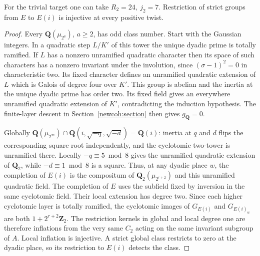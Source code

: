 \begin{corollary}
\label{adds:zeta-injection}
For the trivial target one can take \(R_2=24,\ j_2=7\).
Restriction of strict groups from \(E\) to \(E(i)\) is injective
at every positive twist.
\end{corollary}
\begin{proof}
Every \(\mathbf Q(\mu_{2^a})\), \(a\ge2\), has odd class number.
Start with the Gaussian integers. In a quadratic step \(L/K'\) of
this tower the unique dyadic prime is totally ramified. If \(L\) has
a nonzero unramified quadratic character then its space of such
characters has a nonzero invariant under the involution, since
\((\sigma-1)^2=0\) in characteristic two. Its fixed character defines
an unramified quadratic extension of \(L\) which is Galois of degree
four over \(K'\). This group is abelian and the inertia at the unique
dyadic prime has order two. Its fixed field gives an everywhere
unramified quadratic extension of \(K'\), contradicting the induction
hypothesis. The finite-layer descent in Section~\ref{newcoh:section}
then gives \(g_{\mathbf Q}=0\).

Globally \(\mathbf Q(\mu_{2^\infty})\cap
\mathbf Q(i,\sqrt{-q},\sqrt{-d})=\mathbf Q(i)\):
inertia at \(q\) and \(d\) flips the corresponding square root
independently, and the cyclotomic two-tower is unramified there.
Locally \(-q\equiv5\bmod8\) gives the unramified quadratic extension
of \(\mathbf Q_2\), while \(-d\equiv1\bmod8\) is a square.
Thus, at any dyadic place \(w\), the completion of \(E(i)\) is the
compositum of \(\mathbf Q_2(\mu_{2^{r+2}})\) and this unramified
quadratic field. The completion of \(E\) uses the subfield fixed
by inversion in the same cyclotomic field. Their local extension
has degree two. Since each higher cyclotomic layer is totally
ramified, the cyclotomic images of \(G_{E(i)}\) and
\(G_{E(i)_w}\) are both \(1+2^{r+2}\mathbf Z_2\).
The restriction kernels in global and local degree one are
therefore inflations from the very same \(C_2\) acting on the
same invariant subgroup of \(A\). Local inflation is injective.
A strict global class restricts to zero at the dyadic place,
so its restriction to \(E(i)\) detects the class.
\end{proof}

